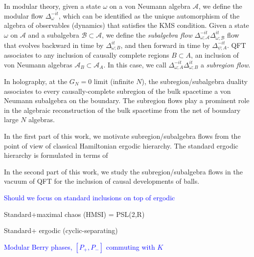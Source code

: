 \documentclass[a4paper,11pt]{article}
\theoremstyle{definition}
\newcommand{\mA}{\mathcal{A}}
\newcommand{\NL}[1]{\textcolor{blue}{#1}}
\begin{document}
In modular theory, given a state $\omega$ on a von Neumann algebra $\mA$, we define the modular flow $\Delta_\omega^{-it}$, which can be identified as the unique automorphism of the algebra of observables (dynamics) that satisfies the KMS condition. Given a state $\omega$ on $\mA$ and a subalgebra $\mathcal{B}\subset \mA$, we define the {\it subalgebra flow} $\Delta_{\omega;\mA}^{-it}\Delta_{\omega;\mathcal{B}}^{it}$ flow that evolves backward in time by $\Delta_{\omega;B}^{it}$, and then forward in time by $\Delta_{\psi;A}^{-it}$. QFT associates to any inclusion of causally complete regions $B\subset A$, an inclusion of von Neumann algebras $\mA_B\subset \mA_A$. In this case, we call $\Delta_{\omega;A}^{-it}\Delta_{\omega;B}^{it}$ a {\it subregion flow}.

In holography, at the $G_N=0$ limit (infinite $N$), the subregion/subalgebra duality associates to every causally-complete subregion of the bulk spacetime a von Neumann subalgebra on the boundary. The subregion flows play a prominent role in the algebraic reconstruction of the bulk spacetime from the net of boundary large $N$ algebras. 

In the first part of this work, we motivate subregion/subalgebra flows from the point of view of classical Hamiltonian ergodic hierarchy. The standard ergodic hierarchy is formulated in terms of 

In the second part of this work, we study the subregion/subalgebra flows in the vacuum of QFT for the inclusion of causal developments of balls.




\NL{Should we focus on standard inclusions on top of ergodic}

Standard+maximal chaos (HMSI)  = PSL(2,R)

Standard+ ergodic (cyclic-separating)

\NL{Modular Berry phases, $[P_+,P_-]$ commuting with $K$}





\end{document}
